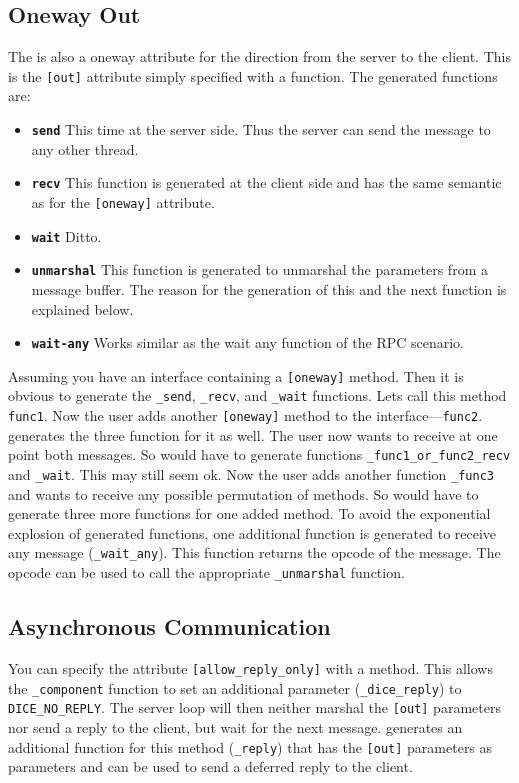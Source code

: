 \subsection{Oneway Out}

The is also a oneway attribute for the direction from the server to the client.
This is the \verb|[out]| attribute simply specified with a function.  The 
generated functions are:

\begin{itemize}
\item \textbf{\texttt{send}} This time at the server side.  Thus the server can
      send the message to any other thread.

\item \textbf{\texttt{recv}} This function is generated at the client side and
      has the same semantic as for the \verb|[oneway]| attribute.

\item \textbf{\texttt{wait}} Ditto.

\item \textbf{\texttt{unmarshal}} This function is generated to unmarshal the 
      parameters from a message buffer. The reason for the generation of this
      and the next function is explained below.

\item \textbf{\texttt{wait-any}} Works similar as the wait any function of the
      RPC scenario.
\end{itemize}

Assuming you have an interface containing a \verb|[oneway]| method.  Then it
is obvious to generate the \verb|_send|, \verb|_recv|, and \verb|_wait|
functions.  Lets call this method \verb|func1|.  Now the user adds another
\verb|[oneway]| method to the interface---\verb|func2|.  \dice{} generates the
three function for it as well.  The user now wants to receive at one point
both messages.  So \dice{} would have to generate functions
\verb|_func1_or_func2_recv| and \verb|_wait|.  This may still seem ok.  Now
the user adds another function \verb|_func3| and wants to receive any possible
permutation of methods.  So \dice{} would have to generate three more
functions for one added method.  To avoid the exponential explosion of
generated functions, one additional function is generated to receive any
message (\verb|_wait_any|).  This function returns the opcode of the message.
The opcode can be used to call the appropriate \verb|_unmarshal| function.

\subsection{Asynchronous Communication}
You can specify the attribute \verb|[allow_reply_only]| with a method.
This allows the \verb|_component| function to set an additional parameter
(\verb|_dice_reply|) to \verb|DICE_NO_REPLY|.  The server loop will then
neither marshal the \verb|[out]| parameters nor send a reply to the client,
but wait for the next message.  \dice{} generates an additional function 
for this method (\verb|_reply|) that has the \verb|[out]| parameters as
parameters and can be used to send a deferred reply to the client.

